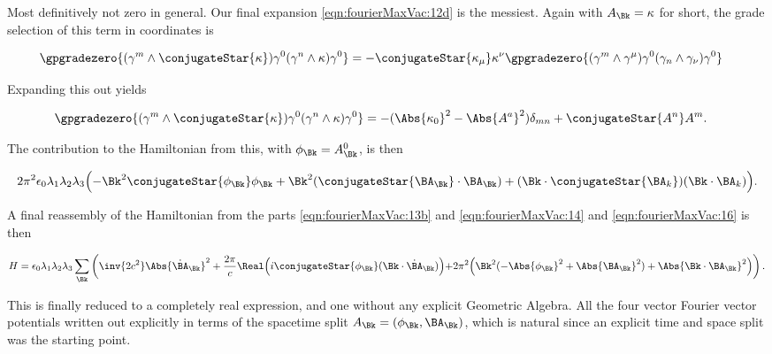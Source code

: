 Most definitively not zero in general.  Our final expansion \autoref{eqn:fourierMaxVac:12d} is the messiest.  Again with $A_\Bk = \kappa$ for short, the grade selection of this term in coordinates is

\begin{align}\label{eqn:fourierMaxVac:15}
\gpgradezero{ (\gamma^m \wedge \conjugateStar{\kappa} ) \gamma^0 (\gamma^n \wedge \kappa ) \gamma^0 }
&=
- \conjugateStar{\kappa_\mu} \kappa^\nu
   \gpgradezero{ (\gamma^m \wedge \gamma^\mu) \gamma^0 (\gamma_n \wedge \gamma_\nu) \gamma^0 }
\end{align}

Expanding this out yields

\begin{align}\label{eqn:fourierMaxVac:15b}
\gpgradezero{ (\gamma^m \wedge \conjugateStar{\kappa} ) \gamma^0 (\gamma^n \wedge \kappa ) \gamma^0 }
&=
- ( \Abs{\kappa_0}^2 - \Abs{A^a}^2 ) \delta_{m n} + \conjugateStar{A^n} A^m.
\end{align}

The contribution to the Hamiltonian from this, with $\phi_\Bk = A^0_\Bk$, is then

\begin{align}\label{eqn:fourierMaxVac:16}
2 \pi^2 \epsilon_0 \lambda_1 \lambda_2 \lambda_3 
\Bigl(
-\Bk^2 \conjugateStar{\phi_\Bk} \phi_\Bk 
+ \Bk^2 (\conjugateStar{\BA_\Bk} \cdot \BA_\Bk)
+ (\Bk \cdot \conjugateStar{\BA_k}) (\Bk \cdot \BA_k)
\Bigr).
\end{align}

A final reassembly of the Hamiltonian from the parts \autoref{eqn:fourierMaxVac:13b} and \autoref{eqn:fourierMaxVac:14} and \autoref{eqn:fourierMaxVac:16} is then

\begin{align}
\label{eqn:fourierMaxVac:17}
H = 
\epsilon_0 \lambda_1 \lambda_2 \lambda_3 \sum_\Bk
\left(
\inv{2 c^2} \Abs{\dot{\BA}_\Bk}^2
+\frac{2 \pi}{c} \Real \Bigl( i \conjugateStar{ \phi_\Bk } (\Bk \cdot \dot{\BA}_\Bk) \Bigl)
+2 \pi^2 
\Bigl(
\Bk^2 ( -\Abs{\phi_\Bk}^2 + \Abs{\BA_\Bk}^2 ) + \Abs{\Bk \cdot \BA_\Bk}^2
\Bigr)
\right).
\end{align}

This is finally reduced to a completely real expression, and one without any explicit Geometric Algebra.  All the four vector Fourier vector potentials written out explicitly in terms of the spacetime split $A_\Bk = (\phi_\Bk, \BA_\Bk)$, which is natural since an explicit time and space split was the starting point.  


